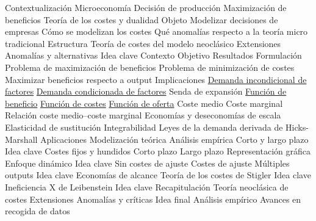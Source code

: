 \documentclass{nuevotema}
\begin{document}
\begin{esquema}[enumerate]
	\1[] 
		\2 Contextualización
			\3 Microeconomía
			\3 Decisión de producción
			\3 Maximización de beneficios
			\3 Teoría de los costes y dualidad
		\2 Objeto
			\3 Modelizar decisiones de empresas
			\3 Cómo se modelizan los costes
			\3 Qué anomalías respecto a la teoría micro tradicional
		\2 Estructura
			\3 Teoría de costes del modelo neoclásico
			\3 Extensiones
			\3 Anomalías y alternativas
	\1 
		\2 Idea clave
			\3 Contexto
			\3 Objetivo
			\3 Resultados
		\2 Formulación
			\3[Primal] Problema de maximización de beneficios
			\3[Dual] Problema de minimización de costes
			\3 Maximizar beneficios respecto a output
		\2 Implicaciones
			\3 \underline{Demanda incondicional de factores}
			\3 \underline{Demanda condicionada de factores}
			\3 Senda de expansión
			\3 \underline{Función de beneficio}
			\3 \underline{Función de costes}
			\3 \underline{Función de oferta}
			\3 Coste medio
			\3 Coste marginal
			\3 Relación coste medio--coste marginal
			\3 Economías y deseconomías de escala
			\3 Elasticidad de sustitución
			\3 Integrabilidad
			\3 Leyes de la demanda derivada de Hicks-Marshall
		\2 Aplicaciones
			\3 Modelización teórica
			\3 Análisis empírica
	\1 
		\2 Corto y largo plazo
			\3 Idea clave
			\3 Costes fijos y hundidos
			\3 Corto plazo
			\3 Largo plazo
			\3 Representación gráfica
		\2 Enfoque dinámico
			\3 Idea clave
			\3 Sin costes de ajuste
			\3 Costes de ajuste
		\2 Múltiples outputs
			\3 Idea clave
			\3 Economías de alcance
	\1 
		\2 Teoría de los costes de Stigler
			\3 Idea clave
		\2 Ineficiencia X de Leibenstein
			\3 Idea clave
	\1[] 
		\2 Recapitulación
			\3 Teoría neoclásica de costes
			\3 Extensiones
			\3 Anomalías y críticas
		\2 Idea final
			\3 Análisis empírico
			\3 Avances en recogida de datos

\end{esquema}

\esquemalargo
\end{document}
